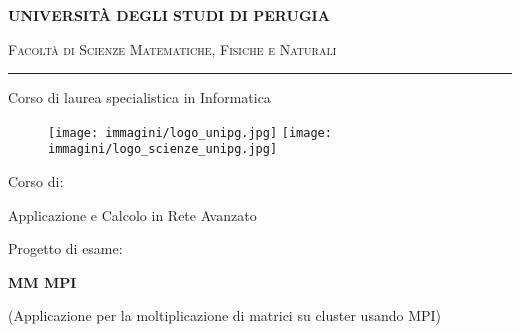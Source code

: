 \begin{titlepage}
    \begin{center}
        \textbf{\Large UNIVERSIT\`{A} DEGLI STUDI DI PERUGIA}
        \vspace{0.5cm}

        {\scshape Facolt\`{a} di Scienze Matematiche, Fisiche e Naturali}

        \vspace{0.5cm}

        \rule[1mm]{\textwidth}{0.2mm}

        \vspace{1cm}

        \begin{Large}Corso di laurea specialistica in {Informatica}\end{Large}

        \vspace{0.5cm}

        \begin{figure}[htbp]
            \begin{center}
                \texttt{[image: immagini/logo\_unipg.jpg]}
                \texttt{[image: immagini/logo\_scienze\_unipg.jpg]}
            \end{center}
        \end{figure}

        \small{Corso di:}

        {\Large Applicazione e Calcolo in Rete Avanzato}

        \vspace{0.4cm}

        \small{Progetto di esame:}

        \textbf{\Large MM MPI}

        \scriptsize{(Applicazione per la moltiplicazione di matrici su cluster usando MPI)}

        \vspace{1cm}

        \hfil{
        }\hfil


\end{center}
\end{titlepage}
